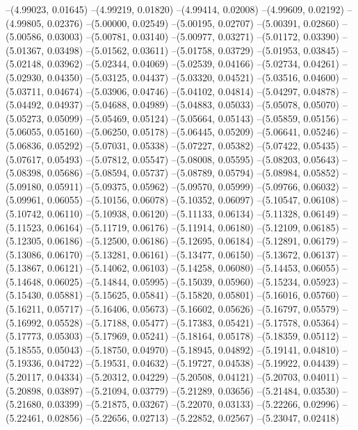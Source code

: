 --(4.99023, 0.01645)
--(4.99219, 0.01820)
--(4.99414, 0.02008)
--(4.99609, 0.02192)
--(4.99805, 0.02376)
--(5.00000, 0.02549)
--(5.00195, 0.02707)
--(5.00391, 0.02860)
--(5.00586, 0.03003)
--(5.00781, 0.03140)
--(5.00977, 0.03271)
--(5.01172, 0.03390)
--(5.01367, 0.03498)
--(5.01562, 0.03611)
--(5.01758, 0.03729)
--(5.01953, 0.03845)
--(5.02148, 0.03962)
--(5.02344, 0.04069)
--(5.02539, 0.04166)
--(5.02734, 0.04261)
--(5.02930, 0.04350)
--(5.03125, 0.04437)
--(5.03320, 0.04521)
--(5.03516, 0.04600)
--(5.03711, 0.04674)
--(5.03906, 0.04746)
--(5.04102, 0.04814)
--(5.04297, 0.04878)
--(5.04492, 0.04937)
--(5.04688, 0.04989)
--(5.04883, 0.05033)
--(5.05078, 0.05070)
--(5.05273, 0.05099)
--(5.05469, 0.05124)
--(5.05664, 0.05143)
--(5.05859, 0.05156)
--(5.06055, 0.05160)
--(5.06250, 0.05178)
--(5.06445, 0.05209)
--(5.06641, 0.05246)
--(5.06836, 0.05292)
--(5.07031, 0.05338)
--(5.07227, 0.05382)
--(5.07422, 0.05435)
--(5.07617, 0.05493)
--(5.07812, 0.05547)
--(5.08008, 0.05595)
--(5.08203, 0.05643)
--(5.08398, 0.05686)
--(5.08594, 0.05737)
--(5.08789, 0.05794)
--(5.08984, 0.05852)
--(5.09180, 0.05911)
--(5.09375, 0.05962)
--(5.09570, 0.05999)
--(5.09766, 0.06032)
--(5.09961, 0.06055)
--(5.10156, 0.06078)
--(5.10352, 0.06097)
--(5.10547, 0.06108)
--(5.10742, 0.06110)
--(5.10938, 0.06120)
--(5.11133, 0.06134)
--(5.11328, 0.06149)
--(5.11523, 0.06164)
--(5.11719, 0.06176)
--(5.11914, 0.06180)
--(5.12109, 0.06185)
--(5.12305, 0.06186)
--(5.12500, 0.06186)
--(5.12695, 0.06184)
--(5.12891, 0.06179)
--(5.13086, 0.06170)
--(5.13281, 0.06161)
--(5.13477, 0.06150)
--(5.13672, 0.06137)
--(5.13867, 0.06121)
--(5.14062, 0.06103)
--(5.14258, 0.06080)
--(5.14453, 0.06055)
--(5.14648, 0.06025)
--(5.14844, 0.05995)
--(5.15039, 0.05960)
--(5.15234, 0.05923)
--(5.15430, 0.05881)
--(5.15625, 0.05841)
--(5.15820, 0.05801)
--(5.16016, 0.05760)
--(5.16211, 0.05717)
--(5.16406, 0.05673)
--(5.16602, 0.05626)
--(5.16797, 0.05579)
--(5.16992, 0.05528)
--(5.17188, 0.05477)
--(5.17383, 0.05421)
--(5.17578, 0.05364)
--(5.17773, 0.05303)
--(5.17969, 0.05241)
--(5.18164, 0.05178)
--(5.18359, 0.05112)
--(5.18555, 0.05043)
--(5.18750, 0.04970)
--(5.18945, 0.04892)
--(5.19141, 0.04810)
--(5.19336, 0.04722)
--(5.19531, 0.04632)
--(5.19727, 0.04538)
--(5.19922, 0.04439)
--(5.20117, 0.04334)
--(5.20312, 0.04229)
--(5.20508, 0.04121)
--(5.20703, 0.04011)
--(5.20898, 0.03897)
--(5.21094, 0.03779)
--(5.21289, 0.03656)
--(5.21484, 0.03530)
--(5.21680, 0.03399)
--(5.21875, 0.03267)
--(5.22070, 0.03133)
--(5.22266, 0.02996)
--(5.22461, 0.02856)
--(5.22656, 0.02713)
--(5.22852, 0.02567)
--(5.23047, 0.02418)
